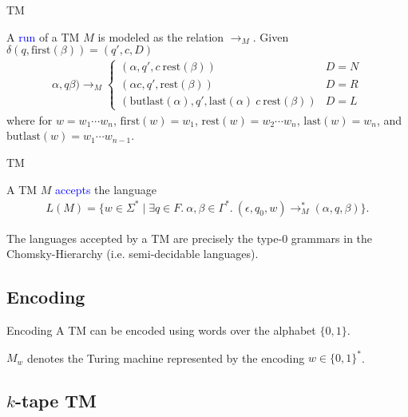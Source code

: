\documentclass{beamer}
\theoremstyle{definition}
\def\b{\textcolor{blue}}
\begin{document}
\begin{frame}{TM}
    \begin{definition}
        A \b{run} of a TM $M$ is modeled as the relation $\to_M$. Given $\delta(q, \text{first}(\beta)) = (q',c,D)$ \begin{align*}
            \alpha,q\beta) \to_M \begin{cases}
                (\alpha,q',c\ \text{rest}(\beta)) & D = N \\
                (\alpha c,q',\text{rest}(\beta)) & D = R \\
                (\text{butlast}(\alpha),q',\text{last}(\alpha)\ c\ \text{rest}(\beta)) & D = L
            \end{cases}
        \end{align*} where for $w = w_1 \cdots w_n$, $\text{first}(w) = w_1$, $\text{rest}(w) = w_2 \cdots w_n$, $\text{last}(w) = w_n$, and $\text{butlast}(w) = w_1 \cdots w_{n-1}$.
    \end{definition}
\end{frame}

\begin{frame}{TM}
    \begin{definition}
        A TM $M$ \b{accepts} the language \begin{align*}
            L(M) = \{w \in \Sigma^* \mid \exists q \in F.\ \alpha, \beta \in \Gamma^*.\ (\epsilon,q_0,w) \to_M^* (\alpha,q,\beta)\}.
        \end{align*}
    \end{definition}\pause
    The languages accepted by a TM are precisely the type-0 grammars in the Chomsky-Hierarchy (i.e. semi-decidable languages).
\end{frame}

\subsection{Encoding}

\begin{frame}{Encoding}
    A TM can be encoded using words over the alphabet $\{0,1\}$.\pause
    \begin{definition}
        $M_w$ denotes the Turing machine represented by the encoding $w \in \{0,1\}^*$.
    \end{definition}
\end{frame}

\subsection{$k$-tape TM}
\end{document}
